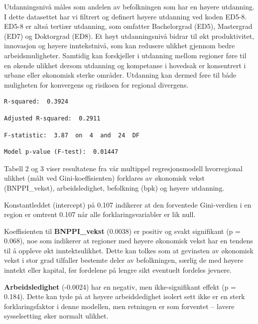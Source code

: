 \documentclass[
  letterpaper,
  DIV=11,
  numbers=noendperiod]{scrartcl}
\begin{document}
Utdanningsnivå måles som andelen av befolkningen som har en høyere
utdanning. I dette datasettet har vi filtrert og definert høyere
utdanning ved koden ED5-8. ED5-8 er altså tertiær utdanning, som
omfatter Bachelorgrad (ED5), Mastergrad (ED7) og Doktorgrad (ED8). Et
høyt utdanningsnivå bidrar til økt produktivitet, innovasjon og høyere
inntekstnivå, som kan redusere ulikhet gjennom bedre arbeidsmuligheter.
Samtidig kan forskjeller i utdanning mellom regioner føre til en økende
ulikhet dersom utdanning og kompetanse i hovedsak er konsentrert i
urbane eller økonomisk sterke områder. Utdanning kan dermed føre til
både muligheten for konvergens og risikoen for regional divergens.

\begin{verbatim}
R-squared:  0.3924 
\end{verbatim}

\begin{verbatim}
Adjusted R-squared:  0.2911 
\end{verbatim}

\begin{verbatim}
F-statistic:  3.87  on  4  and  24  DF
\end{verbatim}

\begin{verbatim}
Model p-value (F-test):  0.01447 
\end{verbatim}

Tabell 2 og 3 viser resultatene fra vår multippel regresjonsmodell
hvorregional ulikhet (målt ved Gini-koeffisienten) forklares av
økonomisk vekst (BNPPI\_vekst), arbeidsledighet, befolkning (bpk) og
høyere utdanning.

Konstantleddet (intercept) på 0.107 indikerer at den forventede
Gini-verdien i en region er omtrent 0.107 når alle forklaringsvariabler
er lik null.

Koeffisienten til \textbf{BNPPI\_vekst} (0.0038) er positiv og svakt
signifikant (p = 0.068), noe som indikerer at regioner med høyere
økonomisk vekst har en tendens til å oppleve økt inntektsulikhet. Dette
kan tolkes som at gevinsten av økonomisk vekst i stor grad tilfaller
bestemte deler av befolkningen, særlig de med høyere inntekt eller
kapital, før fordelene på lengre sikt eventuelt fordeles jevnere.

\textbf{Arbeidsledighet} (-0.0024) har en negativ, men ikke-signifikant
effekt (p = 0.184). Dette kan tyde på at høyere arbeidsledighet isolert
sett ikke er en sterk forklaringsfaktor i denne modellen, men retningen
er som forventet -- lavere sysselsetting øker normalt ulikhet.
\end{document}
